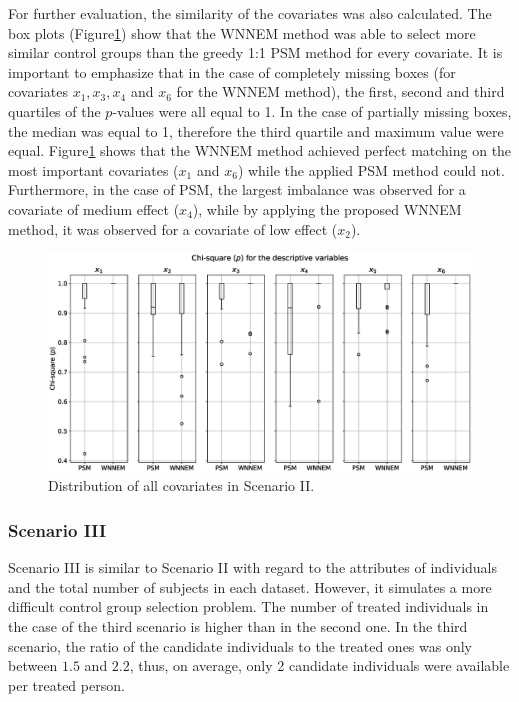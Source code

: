 								
		For further evaluation, the similarity of the covariates was also calculated. The box plots (Figure\ref{fig:wnnem_scen_II_distribution}) show that the WNNEM method was able to select more similar control groups than the greedy 1:1 PSM method for every covariate. It is important to emphasize that in the case of completely missing boxes (for covariates $x_1, x_3, x_4$ and $x_6$ for the WNNEM method), the first, second and third quartiles of the $p$-values were all equal to 1. In the case of partially missing boxes, the median was equal to 1, therefore the third quartile and maximum value were equal. Figure\ref{fig:wnnem_scen_II_distribution} shows that the WNNEM method achieved perfect matching on the most important covariates ($x_1$ and $x_6$) while the applied PSM method could not. Furthermore, in the case of PSM, the largest imbalance was observed for a covariate of medium effect ($x_4$), while by applying the proposed WNNEM method, it was observed for a covariate of low effect ($x_2$).
								
								
		\begin{figure}[h]
			\centering
                \captionsetup{justification=centering}
			\includegraphics[width=\textwidth]{assets/figures/control_group_selection/wnnem/scenII/distribution.eps}
			\caption{Distribution of all covariates in Scenario II. %
   }
			\label{fig:wnnem_scen_II_distribution}    
		\end{figure}
								
		\subsubsection{Scenario III}
		\label{sec:wnnem_scen_3}
								
		Scenario III is similar to Scenario II  with regard to the attributes of individuals and the total number of subjects in each dataset. However, it simulates a more difficult control group selection problem. The number of treated individuals in the case of the third scenario is higher than in the second one. In the third scenario, the ratio of the candidate individuals to the treated ones was only between $1.5$ and $2.2$, thus, on average, only 2 candidate individuals were available per treated person.    
								
